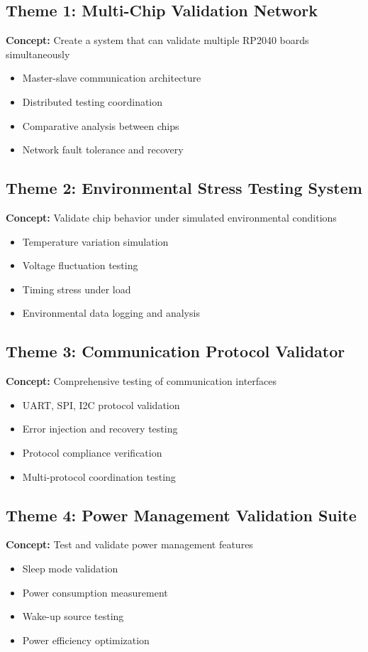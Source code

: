 \documentclass[11pt,a4paper]{article}
\begin{document}
\subsection{Theme 1: Multi-Chip Validation Network}
\textbf{Concept:} Create a system that can validate multiple RP2040 boards simultaneously
\begin{itemize}
    \item Master-slave communication architecture
    \item Distributed testing coordination
    \item Comparative analysis between chips
    \item Network fault tolerance and recovery
\end{itemize}

\subsection{Theme 2: Environmental Stress Testing System}
\textbf{Concept:} Validate chip behavior under simulated environmental conditions
\begin{itemize}
    \item Temperature variation simulation
    \item Voltage fluctuation testing
    \item Timing stress under load
    \item Environmental data logging and analysis
\end{itemize}

\subsection{Theme 3: Communication Protocol Validator}
\textbf{Concept:} Comprehensive testing of communication interfaces
\begin{itemize}
    \item UART, SPI, I2C protocol validation
    \item Error injection and recovery testing
    \item Protocol compliance verification
    \item Multi-protocol coordination testing
\end{itemize}

\subsection{Theme 4: Power Management Validation Suite}
\textbf{Concept:} Test and validate power management features
\begin{itemize}
    \item Sleep mode validation
    \item Power consumption measurement
    \item Wake-up source testing
    \item Power efficiency optimization
\end{itemize}
\end{document}
